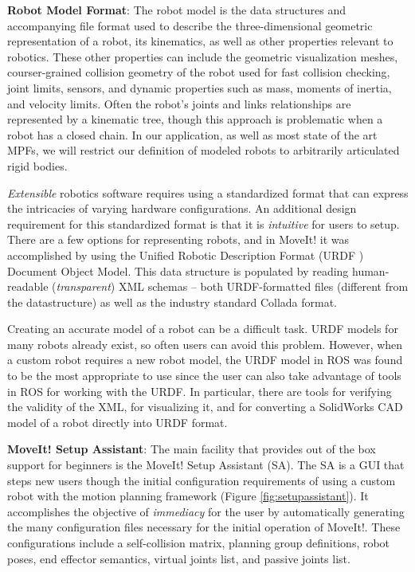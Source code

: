 \documentclass[10pt,journal,compsoc]{joser1}
\begin{document}
{{\bf Robot Model Format}: The robot model is the data structures and
accompanying file format used to describe the three-dimensional geometric
representation of a robot, its kinematics, as well as other properties relevant
to robotics. These other properties can include the geometric visualization
meshes, courser-grained collision geometry of the robot used for fast collision
checking, joint limits, sensors, and dynamic properties such as mass, moments of
inertia, and velocity limits. Often the robot's joints and links relationships
are represented by a kinematic tree, though this approach is problematic when a
robot has a closed chain. In our application, as well as most state of the art
MPFs, we will restrict our definition of modeled robots to arbitrarily
articulated rigid bodies. 

\textit{Extensible} robotics software requires using a standardized format that
can express the intricacies of varying hardware configurations. An additional
design requirement for this standardized format is that it is \textit{intuitive}
for users to setup. There are a few options for representing robots, and in
MoveIt! it was accomplished by using the Unified Robotic Description Format (URDF \cite{urdf}) Document Object Model. This data structure is populated by reading human-readable (\textit{transparent}) XML schemas -- both URDF-formatted files (different from the datastructure) as well as the industry standard Collada \cite{collada} format. 

Creating an accurate model of a robot can be a difficult task. URDF models for
many robots already exist, so often users can avoid this problem. However, when
a custom robot requires a new robot model, the URDF model in ROS was found to be
the most appropriate to use since the user can also take advantage of tools in
ROS for working with the URDF. In particular, there are tools for verifying the
validity of the XML, for visualizing it, and for converting a SolidWorks CAD
model of a robot directly into URDF format. 

{\bf MoveIt! Setup Assistant}: The main facility that provides out of the box
support for beginners is the MoveIt! Setup Assistant (SA). The SA is a GUI that
steps new users though the initial configuration requirements of using a custom
robot with the motion planning framework (Figure \ref{fig:setupassistant}). It
accomplishes the objective of \textit{immediacy} for the user by automatically
generating the many configuration files necessary for the initial operation of
MoveIt!. These configurations include a self-collision matrix, planning group
definitions, robot poses, end effector semantics, virtual joints list, and
passive joints list. 

}
\end{document}
